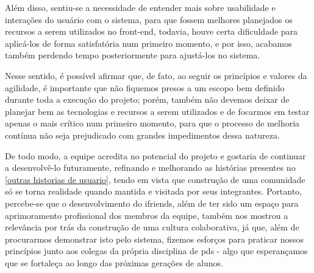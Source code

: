 Além disso, sentiu-se a necessidade de entender mais sobre usabilidade e interações do usuário com o sistema, para que fossem melhores planejados os recursos a serem utilizados no \gls{front-end}, todavia, houve certa dificuldade para aplicá-los de forma satisfatória num primeiro momento, e por isso, acabamos também perdendo tempo posteriormente para ajustá-los no sistema.

Nesse sentido, é possível afirmar que, de fato, ao seguir os princípios e valores da agilidade, é importante que não fiquemos presos a um escopo bem definido durante toda a execução do projeto; porém, também não devemos deixar de planejar bem as tecnologias e recursos a serem utilizados e de focarmos em testar apenas o mais crítico num primeiro momento, para que o processo de melhoria contínua não seja prejudicado com grandes impedimentos dessa natureza. 

De todo modo, a equipe acredita no potencial do projeto e gostaria de continuar a desenvolvê-lo futuramente, refinando e melhorando as histórias presentes no \autoref{outras historias de usuario}, tendo em vista que construção de uma comunidade só se torna realidade quando mantida e visitada por seus integrantes. Portanto, percebe-se que o desenvolvimento do \gls{ifriends}, além de ter sido um espaço para aprimoramento profissional dos membros da equipe, também nos mostrou a relevância por trás da construção de uma cultura colaborativa, já que, além de procurarmos demonstrar isto pelo sistema, fizemos esforços para praticar nossos princípios junto aos colegas da própria disciplina de \acs{pds} - algo que esperançamos que se fortaleça ao longo das próximas gerações de alunos.
